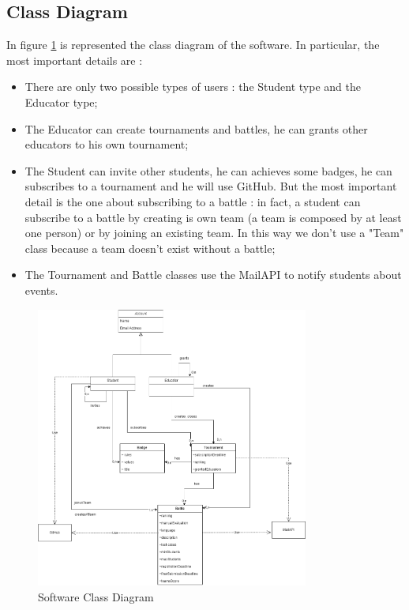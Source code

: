 \subsection{Class Diagram}
    In figure \ref{fig:software-class-diagram} is represented the class diagram of the software. In particular, the most important details are :
    \begin{itemize}
        \item There are only two possible types of users : the Student type and the Educator type;
        \item The Educator can create tournaments and battles, he can grants other educators to his own tournament;
        \item The Student can invite other students, he can achieves some badges, he can subscribes to a tournament and he will use GitHub. But the most important detail is the one about subscribing to a battle : in fact, a student can subscribe to a battle by creating is own team (a team is composed by at least one person) or by joining an existing team. In this way we don't use a "Team" class because a team doesn't exist without a battle;
        \item The Tournament and Battle classes use the MailAPI to notify students about events.
    
    \end{itemize}
\begin{figure}[H]
    \centering
    \includegraphics[width=0.8\textwidth]{state_diagrams/ClassDiagram.png}
    \caption{Software Class Diagram}
    \label{fig:software-class-diagram}
\end{figure}

